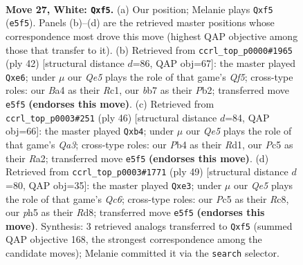 \documentclass[11pt]{article}
\begin{document}
\clearpage

\begin{figure}[p]\centering
\begin{subfigure}{0.46\textwidth}\centering
\resizebox{\linewidth}{!}{%
\newchessgame
\chessboard[
  setfen={6r1/1b3pk1/2p2rp1/p1P1Qq1p/BP5P/8/P2N2P1/1RB3K1 w - - 1 27},
  showmover=false,
  pgfstyle=straightmove, color=movearrow, markmove={e5-f5}
]}
\caption{}
\end{subfigure}\hfill
\begin{subfigure}{0.46\textwidth}\centering
\resizebox{\linewidth}{!}{%
\newchessgame
\chessboard[
  setfen={r4rk1/p4pp1/1p2q2p/2p2Q1R/8/P3P1P1/1P2BPb1/2R1K3 w - - 0 22},
  showmover=false,
  pgfstyle=straightmove, color=movearrow, markmove={f5-e6}
]}
\caption{}
\end{subfigure}
\\[4pt]
\begin{subfigure}{0.46\textwidth}\centering
\resizebox{\linewidth}{!}{%
\newchessgame
\chessboard[
  setfen={3r2kr/1pN2ppp/4p3/p3P3/Pq6/Qn1b4/R4BPP/3R3K w - - 0 24},
  showmover=false,
  pgfstyle=straightmove, color=movearrow, markmove={a3-b4}
]}
\caption{}
\end{subfigure}\hfill
\begin{subfigure}{0.46\textwidth}\centering
\resizebox{\linewidth}{!}{%
\newchessgame
\chessboard[
  setfen={2rr1nk1/5pp1/Bp2p3/4P1p1/3P4/P1q1Q2P/5PP1/3R1RK1 b - - 0 25},
  showmover=false,
  pgfstyle=straightmove, color=movearrow, markmove={c3-e3}
]}
\caption{}
\end{subfigure}
\caption{\textbf{Move 27, White: \texttt{Qxf5}.} (a) Our position; Melanie plays \texttt{Qxf5} (\texttt{e5f5}). Panels (b)--(d) are the retrieved master positions whose correspondence most drove this move (highest QAP objective among those that transfer to it). (b) Retrieved from \texttt{ccrl\_top\_p0000\#1965} (ply 42) [structural distance $d$=86, QAP obj=67]: the master played \texttt{Qxe6}; under $\mu$ our \emph{Qe5} plays the role of that game's \emph{Qf5}; cross-type roles: our \emph{B}a4 as their \emph{R}c1, our \emph{b}b7 as their \emph{P}b2; transferred move \texttt{e5f5} \textbf{(endorses this move)}. (c) Retrieved from \texttt{ccrl\_top\_p0003\#251} (ply 46) [structural distance $d$=84, QAP obj=66]: the master played \texttt{Qxb4}; under $\mu$ our \emph{Qe5} plays the role of that game's \emph{Qa3}; cross-type roles: our \emph{P}b4 as their \emph{R}d1, our \emph{P}c5 as their \emph{R}a2; transferred move \texttt{e5f5} \textbf{(endorses this move)}. (d) Retrieved from \texttt{ccrl\_top\_p0003\#1771} (ply 49) [structural distance $d$=80, QAP obj=35]: the master played \texttt{Qxe3}; under $\mu$ our \emph{Qe5} plays the role of that game's \emph{Qc6}; cross-type roles: our \emph{P}c5 as their \emph{R}c8, our \emph{p}h5 as their \emph{R}d8; transferred move \texttt{e5f5} \textbf{(endorses this move)}. Synthesis: 3 retrieved analogs transferred to \texttt{Qxf5} (summed QAP objective 168, the strongest correspondence among the candidate moves); Melanie committed it via the \texttt{search} selector.}
\label{fig:thought-m52}
\end{figure}
\end{document}
